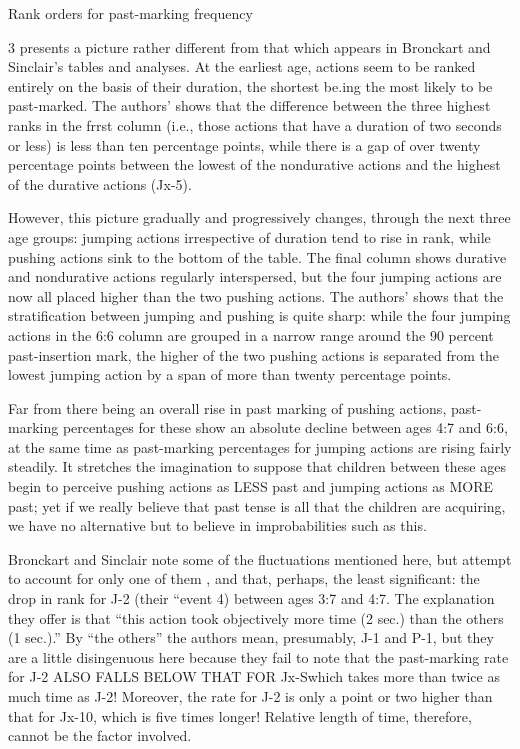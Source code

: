 Rank orders for past-marking frequency

\begin{table}
\caption{3 presents a picture rather different from that which appears in Bronckart and Sinclair's tables and analyses. At the earliest age, actions seem to be ranked entirely on the basis of their duration, the shortest be.ing the most likely to be past-marked. The authors'  shows that the difference between the three highest ranks in the frrst column (i.e., those actions that have a duration of two seconds or less) is less than ten percentage points, while there is a gap of over twenty percentage points between the lowest of the nondurative actions and the highest of the durative actions (Jx-5).}
\label{tab:3}
\end{table}

However, this picture gradually and progressively changes, through the next three age groups: jumping actions irrespective of duration tend to rise in rank, while pushing actions sink to the bottom of the table. The final column shows durative and nondurative actions regularly interspersed, but the four jumping actions are now all placed higher than the two pushing actions. The authors' shows that the stratification between jumping and pushing is quite sharp: while the
four jumping actions in the 6:6 column are grouped in a narrow range around the 90 percent past-insertion mark, the higher of the two push\-ing actions is separated from the lowest jumping action by a span of more than twenty percentage points.

Far from there being an overall rise in past marking of pushing actions, past-marking percentages for these show an absolute decline between ages 4:7 and 6:6, at the same time as past-marking percentages for jumping actions are rising fairly steadily. It stretches the imagina\-tion to suppose that children between these ages begin to perceive pushing actions as LESS past and jumping actions as MORE past; yet if we really believe that past tense is all that the children are ac\-quiring, we have no alternative but to believe in improbabilities such as this.

Bronckart and Sinclair note some of the fluctuations mentioned here, but attempt to account for only one of them , and that, perhaps, the least significant: the drop in rank for J-2 (their ``event 4{\textquotedbl}) be\-tween ages 3:7 and 4:7. The explanation they offer is that ``this action took objectively more time (2 sec.) than the others (1 sec.).'' By ``the others'' the authors mean, presumably, J-1 and P-1, but they are a little disingenuous here because they fail to note that the past-marking rate for J-2 ALSO FALLS BELOW THAT FOR Jx-Swhich takes more than twice as much time as J-2! Moreover, the rate for J-2 is only a point or two higher than that for Jx-10, which is five times longer! Relative length of time, therefore, cannot be the factor involved.


